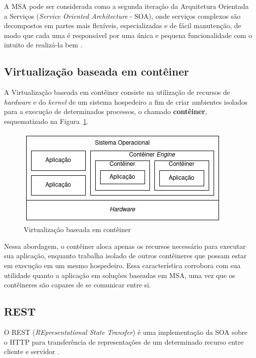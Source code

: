 \documentclass[12pt]{article}
\begin{document}
A MSA pode ser considerada como a segunda iteração da Arquitetura Orientada a Serviços (\textit{Service Oriented Architecture} - SOA), onde serviços complexos são decompostos em partes mais flexíveis, especializadas e de fácil manutenção, de modo que cada uma é responsável por uma única e pequena funcionalidade com o intuito de realizá-la bem \cite{homay2019}. 

\subsection{Virtualização baseada em contêiner}

A Virtualização baseada em contêiner \cite{eder2016} consiste na utilização de recursos de \textit{hardware} e do \textit{kernel} de um sistema hospedeiro a fim de criar ambientes isolados para a execução de determinados processos, o chamado \textbf{contêiner}, esquematizado na Figura~\ref{fig:conteiner}.

\begin{figure}[ht]
	\centering
	\includegraphics[width=.8\textwidth]{conteiner.jpg}
	\caption{Virtualização baseada em contêiner}
	\label{fig:conteiner}
\end{figure} 

Nessa abordagem, o contêiner aloca apenas os recursos necessário para executar sua aplicação, enquanto trabalha isolado de outros contêineres que possam estar em execução em um mesmo hospedeiro. Essa característica corrobora com sua utilidade quanto a aplicação em soluções baseadas em MSA, uma vez que os contêineres são capazes de se comunicar entre si.

\subsection{REST}

O REST (\textit{REpresentational State Transfer}) é uma implementação da SOA sobre o HTTP para transferência de representações de um determinado recurso entre cliente e servidor \cite{mumbaikar2013}.
\end{document}
